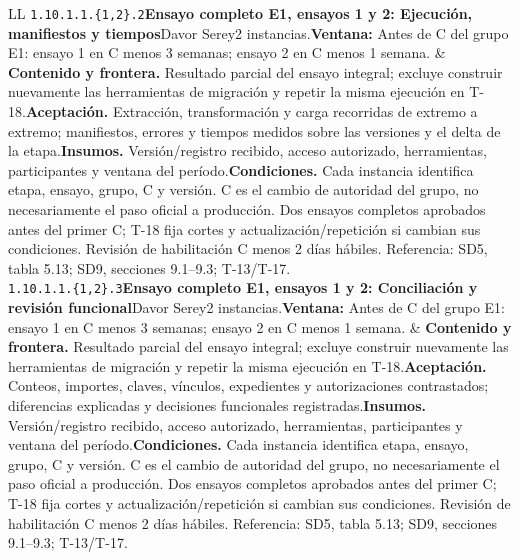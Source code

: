 \begin{longtable}{L{\tabcolsep\relax}L{\tabcolsep\relax}}
\texttt{1.\allowbreak{}10.\allowbreak{}1.\allowbreak{}1.\allowbreak{}\{1,\allowbreak{}2\}.\allowbreak{}2}\newline{}\textbf{Ensayo completo E1, ensayos 1 y 2: Ejecución, manifiestos y tiempos}\newline{}Davor Serey\newline{}2 instancias.\newline{}\textbf{Ventana:} Antes de C del grupo E1: ensayo 1 en C menos 3 semanas; ensayo 2 en C menos 1 semana. & \textbf{Contenido y frontera.} Resultado parcial del ensayo integral; excluye construir nuevamente las herramientas de migración y repetir la misma ejecución en T-18.\newline{}\textbf{Aceptación.} Extracción, transformación y carga recorridas de extremo a extremo; manifiestos, errores y tiempos medidos sobre las versiones y el delta de la etapa.\newline{}\textbf{Insumos.} Versión/registro recibido, acceso autorizado, herramientas, participantes y ventana del período.\newline{}\textbf{Condiciones.} Cada instancia identifica etapa, ensayo, grupo, C y versión. C es el cambio de autoridad del grupo, no necesariamente el paso oficial a producción. Dos ensayos completos aprobados antes del primer C; T-18 fija cortes y actualización/repetición si cambian sus condiciones. Revisión de habilitación C menos 2 días hábiles. Referencia: SD5, tabla 5.13; SD9, secciones 9.1--9.3; T-13/T-17.\\\hline
\texttt{1.\allowbreak{}10.\allowbreak{}1.\allowbreak{}1.\allowbreak{}\{1,\allowbreak{}2\}.\allowbreak{}3}\newline{}\textbf{Ensayo completo E1, ensayos 1 y 2: Conciliación y revisión funcional}\newline{}Davor Serey\newline{}2 instancias.\newline{}\textbf{Ventana:} Antes de C del grupo E1: ensayo 1 en C menos 3 semanas; ensayo 2 en C menos 1 semana. & \textbf{Contenido y frontera.} Resultado parcial del ensayo integral; excluye construir nuevamente las herramientas de migración y repetir la misma ejecución en T-18.\newline{}\textbf{Aceptación.} Conteos, importes, claves, vínculos, expedientes y autorizaciones contrastados; diferencias explicadas y decisiones funcionales registradas.\newline{}\textbf{Insumos.} Versión/registro recibido, acceso autorizado, herramientas, participantes y ventana del período.\newline{}\textbf{Condiciones.} Cada instancia identifica etapa, ensayo, grupo, C y versión. C es el cambio de autoridad del grupo, no necesariamente el paso oficial a producción. Dos ensayos completos aprobados antes del primer C; T-18 fija cortes y actualización/repetición si cambian sus condiciones. Revisión de habilitación C menos 2 días hábiles. Referencia: SD5, tabla 5.13; SD9, secciones 9.1--9.3; T-13/T-17.\\\hline

\end{longtable}
